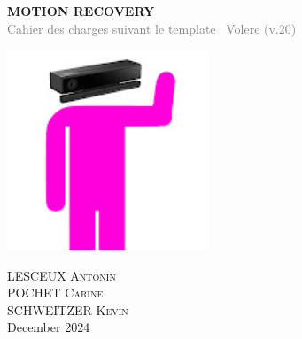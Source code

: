 \begin{titlepage}
    \setlength{\topmargin}{4cm} %
    \begin{center}
        \vfill 
        \begin{minipage}{0.8\textwidth}
            \centering
            {\Huge \textbf{\uppercase{Motion Recovery}}}\\ %
            \vspace{4mm}
            {\small \textcolor{gray}{\hfill Cahier des charges suivant le template~\cite{volere20} Volere (v.20)}}
        \end{minipage}
        
        \vspace{15mm}
        \includegraphics[height=6cm]{images/motion-recovery-logo.jpeg} %
        \vspace{30mm}
        
        \begin{minipage}{0.7\textwidth}
            \centering
            \textsc{LESCEUX Antonin}\\
            \vspace{3mm}
            \textsc{POCHET Carine}\\
            \vspace{3mm}
            \textsc{SCHWEITZER Kevin}\\
            \vspace{10mm}
            December 2024
        \end{minipage}
        \vfill
    \end{center}
\end{titlepage}